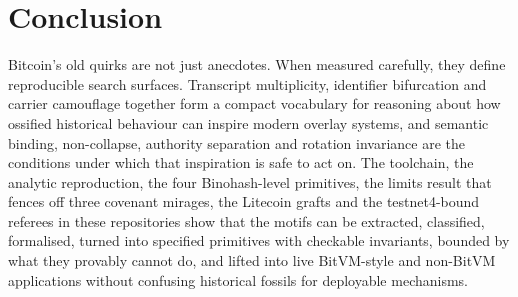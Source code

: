 \documentclass[11pt]{article}
\begin{document}
\section*{Conclusion}

Bitcoin's old quirks are not just anecdotes. When measured carefully, they
define reproducible search surfaces. Transcript multiplicity, identifier
bifurcation and carrier camouflage together form a compact vocabulary for
reasoning about how ossified historical behaviour can inspire modern overlay
systems, and semantic binding, non-collapse, authority separation and rotation
invariance are the conditions under which that inspiration is safe to act on.
The toolchain, the analytic reproduction, the four Binohash-level primitives,
the limits result that fences off three covenant mirages, the Litecoin grafts
and the testnet4-bound referees in these repositories show that the motifs can
be extracted, classified, formalised, turned into specified primitives with
checkable invariants, bounded by what they provably cannot do, and lifted into
live BitVM-style and non-BitVM applications without confusing historical fossils
for deployable mechanisms.



\end{document}
